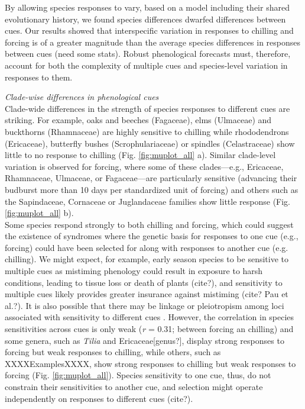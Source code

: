 \documentclass{article}\usepackage[]{graphicx}\usepackage[]{color}
\begin{document}
By allowing species responses to vary, based on a model including their shared evolutionary history, we found species differences dwarfed differences between cues. Our results showed that interspecific variation in responses to chilling and forcing is of a greater magnitude than the average species differences in responses between cues (need some stats). Robust phenological forecasts must, therefore, account for both the complexity of multiple cues and species-level variation in responses to them.


\emph{Clade-wise differences in phenological cues}\\

Clade-wide differences in the strength of species responses to different cues are striking. For example, oaks and beeches (Fagaceae), elms (Ulmaceae) and buckthorns (Rhamnaceae) are highly sensitive to chilling while rhododendrons (Ericaceae), butterfly bushes (Scrophulariaceae) or spindles (Celastraceae) show little to no response to chilling (Fig. \ref{fig:muplot_all} a). %
Similar clade-level variation is observed for forcing, where some of these clades---e.g., Ericaceae, Rhamnaceae, Ulmaceae, or Fagaceae---are particularly sensitive (advancing their budburst more than 10 days per standardized unit of forcing) and others such as the Sapindaceae, Cornaceae or Juglandaceae families show little response (Fig. \ref{fig:muplot_all} b).\\ %

Some species respond strongly to both chilling and forcing, which could suggest the existence of syndromes where the genetic basis for responses to one cue (e.g., forcing) could have been selected for along with responses to another cue (e.g. chilling). We might expect, for example, early season species to be sensitive to multiple cues as mistiming phenology could result in exposure to harsh conditions, leading to tissue loss or death of plants (cite?), and sensitivity to multiple cues likely provides greater insurance against mistiming (cite? Pau et al.?). It is also possible that there may be linkage or pleiotropism among loci associated with sensitivity to different cues \citep{nakagawa2005}. However, the correlation in species sensitivities across cues is only weak (\emph{r} = 0.31; between forcing an chilling) and some genera, such as \emph{Tilia} and Ericaceae[genus?], display strong responses to forcing but weak responses to chilling, while others, such as XXXXExamplesXXXX, show strong responses to chilling but weak responses to forcing (Fig. \ref{fig:muplot_all}). Species sensitivity to one cue, thus, do not constrain their sensitivities to another cue, and selection might operate independently on responses to different cues (cite?).\\
\end{document}
